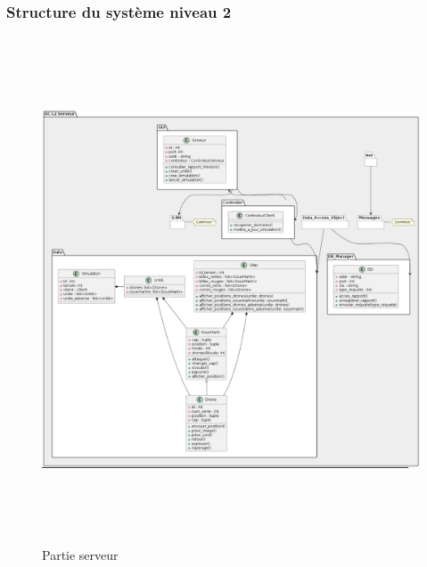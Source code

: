\subsubsection{Structure du système niveau 2}
\begin{figure}[H]
	\centering
	\includegraphics[height=15cm]{img/DC_L2_Serveur.png} 
	\caption{Partie serveur}
\end{figure}

